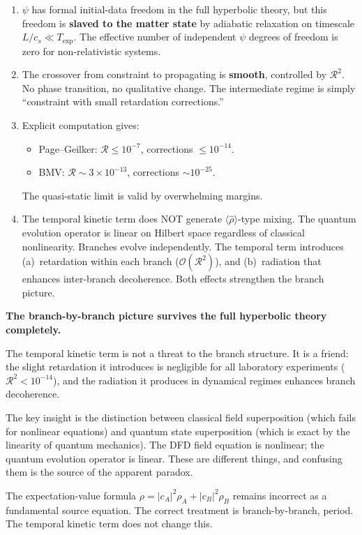 \documentclass[12pt,a4paper]{article}
\newcommand{\order}[1]{\mathcal{O}(#1)}
\begin{document}
\begin{enumerate}
\item[\textbf{Q1.}] $\psi$ has formal initial-data freedom in the full
hyperbolic theory, but this freedom is \textbf{slaved to the matter
state} by adiabatic relaxation on timescale $L/c_s \ll T_\mathrm{exp}$.
The effective number of independent $\psi$ degrees of freedom is zero
for non-relativistic systems.

\item[\textbf{Q2.}] The crossover from constraint to propagating is
\textbf{smooth}, controlled by $\mathcal{R}^2$. No phase transition,
no qualitative change. The intermediate regime is simply ``constraint
with small retardation corrections.''

\item[\textbf{Q3.}] Explicit computation gives:
\begin{itemize}
\item Page--Geilker: $\mathcal{R} \leq 10^{-7}$, corrections $\leq 10^{-14}$.
\item BMV: $\mathcal{R} \sim 3 \times 10^{-13}$, corrections $\sim 10^{-25}$.
\end{itemize}
The quasi-static limit is valid by overwhelming margins.

\item[\textbf{Q4.}] The temporal kinetic term does NOT generate
$\langle\hat\rho\rangle$-type mixing. The quantum evolution operator is
linear on Hilbert space regardless of classical nonlinearity. Branches
evolve independently. The temporal term introduces
(a)~retardation within each branch ($\order{\mathcal{R}^2}$), and
(b)~radiation that enhances inter-branch decoherence. Both effects
strengthen the branch picture.
\end{enumerate}

\begin{tcolorbox}[colback=green!5!white, colframe=dfdgreen,
title=Bottom Line]
\textbf{The branch-by-branch picture survives the full hyperbolic theory
completely.}

The temporal kinetic term is not a threat to the branch structure.
It is a friend: the slight retardation it introduces is negligible for
all laboratory experiments ($\mathcal{R}^2 < 10^{-14}$), and the
radiation it produces in dynamical regimes enhances branch decoherence.

The key insight is the distinction between classical field superposition
(which fails for nonlinear equations) and quantum state superposition
(which is exact by the linearity of quantum mechanics). The DFD field
equation is nonlinear; the quantum evolution operator is linear. These
are different things, and confusing them is the source of the apparent
paradox.

The expectation-value formula $\rho = |c_A|^2\rho_A + |c_B|^2\rho_B$
remains incorrect as a fundamental source equation. The correct treatment
is branch-by-branch, period. The temporal kinetic term does not change this.
\end{tcolorbox}
\end{document}
